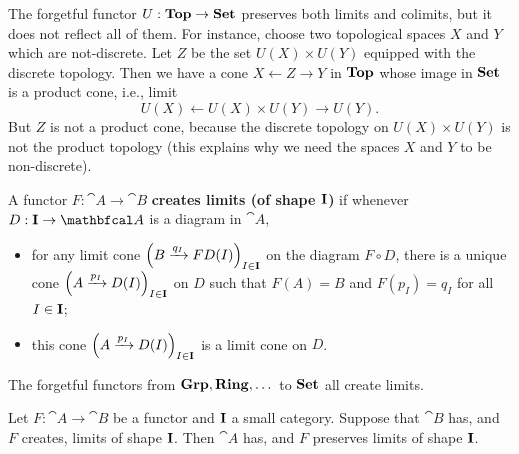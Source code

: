 \begin{example}
    The forgetful functor $U:\mathbf{Top}\to\mathbf{Set}$ preserves both limits and colimits, but it does not reflect all of them. For instance, choose two topological spaces $X$ and $Y$ which are not-discrete. Let $Z$ be the set $U(X)\times U(Y)$ equipped with the discrete topology. Then we have a cone $X\leftarrow Z\rightarrow Y$ in $\mathbf{Top}$ whose image in $\mathbf{Set}$ is a product cone, i.e., limit
    \begin{equation*}
        U(X)\leftarrow U(X)\times U(Y)\rightarrow U(Y).
    \end{equation*}
    But $Z$ is not a product cone, because the discrete topology on $U(X)\times U(Y)$ is not the product topology (this explains why we need the spaces $X$ and $Y$ to be non-discrete).
\end{example}

\begin{definition}
    A functor $F:\cat{A}\to\cat{B}$ \textbf{creates limits (of shape $\mathbf{I}$)} if whenever $D:\bcat{I}\to\cat{A}$ is a diagram in $\cat{A}$,
    \begin{itemize}
        \item for any limit cone $\Big( B\xrightarrow{q_I} FD(I) \Big)_{I\in\mathbf{I}}$ on the diagram $F\circ D$, there is a unique cone $\Big( A\xrightarrow{p_I} D(I) \Big)_{I\in\mathbf{I}}$ on $D$ such that $F(A)=B$ and $F(p_I)=q_I$ for all $I\in\mathbf{I}$;
        \item this cone $\Big( A\xrightarrow{p_I} D(I) \Big)_{I\in\mathbf{I}}$ is a limit cone on $D$.
    \end{itemize}
\end{definition}

The forgetful functors from $\mathbf{Grp}, \mathbf{Ring},\dots$ to $\mathbf{Set}$ all create limits.

\begin{lemma}
    Let $F:\cat{A}\to\cat{B}$ be a functor and $\mathbf{I}$ a small category. Suppose that $\cat{B}$ has, and $F$ creates, limits of shape $\mathbf{I}$. Then $\cat{A}$ has, and $F$ preserves limits of shape $\mathbf{I}$.
\end{lemma}
